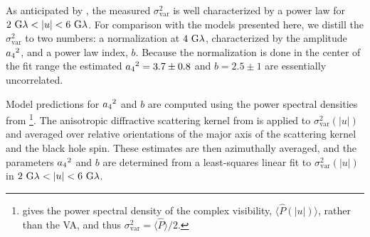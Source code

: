 As anticipated by \citet{Georgiev_2022}, the measured $\sigma_\text{var}^2$ is well characterized by a power law for $2~{\rm G}\lambda < |u| < 6~{\rm G}\lambda$.  For comparison with the models presented here, we distill the $\sigma_{\text{var}}^2$ to two numbers: a normalization at $4~{\rm G}\lambda$, characterized by the amplitude ${a_4}^2$, and a power law index, $b$.  Because the normalization is done in the center of the fit range the estimated ${a_4}^2=3.7\pm0.8$ and $b=2.5\pm1$ are essentially uncorrelated.

Model predictions for ${a_4}^2$ and $b$ are computed using the power spectral densities from \citet{Georgiev_2022}\footnote{\citet{Georgiev_2022} gives the power spectral density of the complex visibility, $\langle\hat{P}(|u|)\rangle$, rather than the VA, and thus $\sigma_\text{var}^2=\langle \hat{P}\rangle/2$. }. The anisotropic diffractive scattering kernel from \citet{Johnson_2018} is applied to $\sigma_\text{var}^2(|u|)$ and averaged over relative orientations of the major axis of the scattering kernel and the black hole spin.  These estimates are then azimuthally averaged, and the parameters ${a_4}^2$ and $b$ are determined from a least-squares linear fit to $\sigma_\text{var}^2(|u|)$ in $2~{\rm G}\lambda < |u| < 6~{\rm G}\lambda$. 
